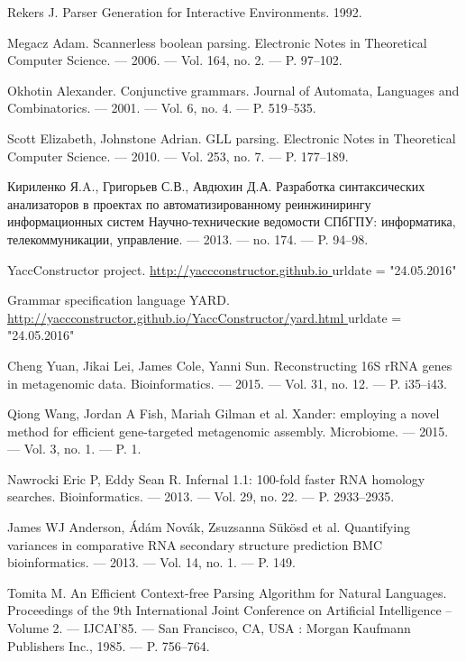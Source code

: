 \begin{thebibliography}{99}


  Rekers J.
  Parser Generation for Interactive Environments. 
  1992.

  Megacz Adam. 
  Scannerless boolean parsing. 
  Electronic Notes in Theoretical Computer Science. –– 2006. –– Vol. 164, no. 2. –– P. 97–102.
  
  Okhotin Alexander. 
  Conjunctive grammars. 
  Journal of Automata, Languages and Combinatorics. –– 2001. –– Vol. 6, no. 4. –– P. 519–535.  

  Scott Elizabeth, Johnstone Adrian. 
  GLL parsing. 
  Electronic Notes in Theoretical Computer Science. –– 2010. –– Vol. 253, no. 7. –– P. 177–189.  

  Кириленко Я.A., Григорьев С.В., Авдюхин Д.А.
  Разработка синтаксических анализаторов в проектах по автоматизированному реинжинирингу информационных систем
  Научно-технические ведомости СПбГПУ: информатика, телекоммуникации, управление. –– 2013. –– no. 174. –– P. 94–98.  

  YaccConstructor project.
  \url{ http://yaccconstructor.github.io }
  urldate = "24.05.2016"

  Grammar specification language YARD.
  \url{ http://yaccconstructor.github.io/YaccConstructor/yard.html }
  urldate = "24.05.2016"

  Cheng Yuan, Jikai Lei, James Cole, Yanni Sun.
  Reconstructing 16S rRNA genes in metagenomic data.
  Bioinformatics. –– 2015. –– Vol. 31, no. 12. –– P. i35–i43.

  Qiong Wang, Jordan A Fish, Mariah Gilman et al. 
  Xander: employing a novel method for efficient gene-targeted metagenomic assembly. 
  Microbiome. –– 2015. –– Vol. 3, no. 1. –– P. 1.  

  Nawrocki Eric P, Eddy Sean R. 
  Infernal 1.1: 100-fold faster RNA homology searches.
  Bioinformatics. –– 2013. –– Vol. 29, no. 22. –– P. 2933–2935.  




  James WJ Anderson, {\'A}d{\'a}m Nov{\'a}k, Zsuzsanna Sükösd et al.
  Quantifying variances in comparative RNA secondary structure prediction 
  BMC bioinformatics. –– 2013. –– Vol. 14, no. 1. –– P. 149.  

  Tomita M.
  An Efficient Context-free Parsing Algorithm for Natural Languages.
  Proceedings of the 9th International Joint Conference on Artificial Intelligence -- Volume 2. –– IJCAI’85. –– San Francisco, CA, USA : Morgan Kaufmann Publishers Inc., 1985. –– P. 756–764.


\end{thebibliography}
